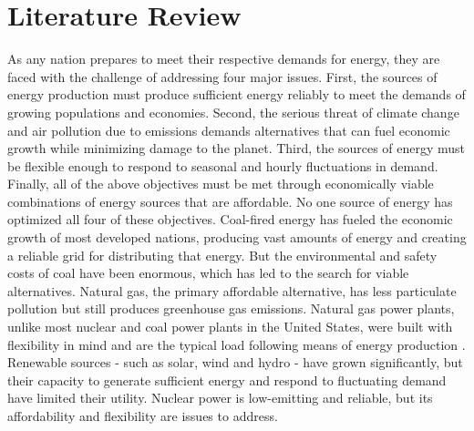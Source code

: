 \documentclass[12pt]{UIdahoMastersThesis}
\begin{document}
\mainmatter  %
\setcounter{secnumdepth}{3}  %




\clearpage
\chapter{Literature Review}
\label{Introduction to Nuclear Renewable Hybrid Energy Systems}

As any nation prepares to meet their respective demands for energy, they are faced with the challenge of addressing four major issues. First, the sources of energy production must produce sufficient energy reliably to meet the demands of growing populations and economies. Second, the serious threat of climate change and air pollution due to emissions demands alternatives that can fuel economic growth while minimizing damage to the planet. Third, the sources of energy must be flexible enough to respond to seasonal and hourly fluctuations in demand. Finally, all of the above objectives must be met through economically viable combinations of energy sources that are affordable.
No one source of energy has optimized all four of these objectives. Coal-fired energy has fueled the economic growth of most developed nations, producing vast amounts of energy and creating a reliable grid for distributing that energy. But the environmental and safety costs of coal have been enormous, which has led to the search for viable alternatives. Natural gas, the primary affordable alternative, has less particulate pollution but still produces greenhouse gas emissions. Natural gas power plants, unlike most nuclear and coal power plants in the United States, were built with flexibility in mind and are the typical load following means of energy production \cite{MITEnergyInitiative2011}. Renewable sources - such as solar, wind and hydro - have grown significantly, but their capacity to generate sufficient energy and respond to fluctuating demand have limited their utility. Nuclear power is low-emitting and reliable, but its affordability and flexibility are issues to address.
\end{document}
